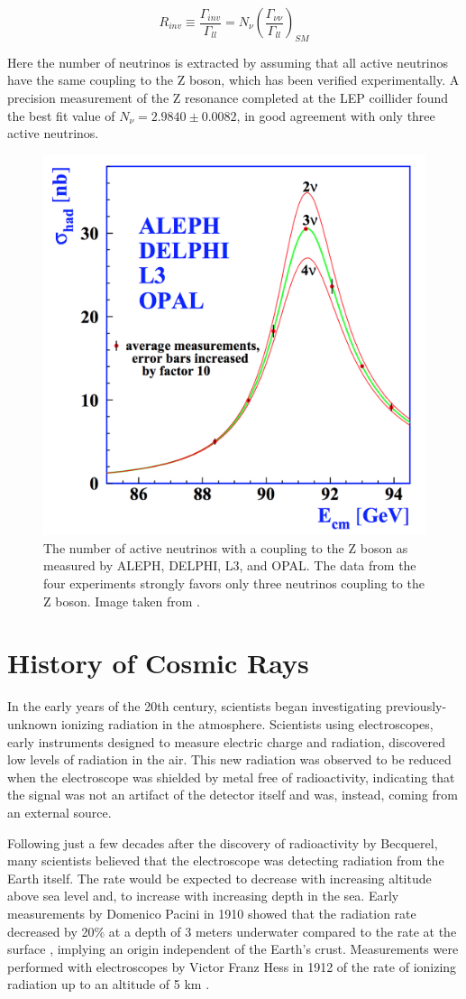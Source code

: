 \begin{equation}
	R_{inv} \equiv \frac{\Gamma_{inv}}{\Gamma_{ll}} = N_\nu \left( \frac{\Gamma_{\nu\nu}}{\Gamma_{ll}}\right)_{SM}
\end{equation}

Here the number of neutrinos is extracted by assuming that all active neutrinos have the same coupling to the Z boson, which has been verified experimentally. 
A precision measurement of the Z resonance completed at the LEP coillider found the best fit value of $N_\nu = 2.9840 \pm 0.0082$, in good agreement with only three active neutrinos.

\begin{figure}
\centering
\includegraphics[width=0.5\linewidth]{ALEPH_NumNu.png} 
\caption[The number of neutrinos coupling to the Z from ALEPH]{The number of active neutrinos with a coupling to the Z boson as measured by ALEPH, DELPHI, L3, and OPAL. The data from the four experiments strongly favors only three neutrinos coupling to the Z boson. Image taken from \cite{ALEPH-3Nu}.}
\label{fig:ALEPH}
\end{figure}

\section{History of Cosmic Rays}
\label{sec:cosmic_rays}
In the early years of the 20th century, scientists began investigating previously-unknown ionizing radiation in the atmosphere.
Scientists using electroscopes, early instruments designed to measure electric charge and radiation, discovered low levels of radiation in the air.
This new radiation was observed to be reduced when the electroscope was shielded by metal free of radioactivity, indicating that the signal was not an artifact of the detector itself and was, instead, coming from an external source.

Following just a few decades after the discovery of radioactivity by Becquerel, many scientists believed that the electroscope was detecting radiation from the Earth itself.
The rate would be expected to decrease with increasing altitude above sea level and, to increase with increasing depth in the sea.
Early measurements by Domenico Pacini in 1910 showed that the radiation rate decreased by 20\% at a depth of 3 meters underwater compared to the rate at the surface \cite{Pacini-CRSource}, implying an origin independent of the Earth's crust.
Measurements were performed with electroscopes by Victor Franz Hess in 1912 of the rate of ionizing radiation up to an altitude of 5 km \cite{Hoerandel-CRHistory}.

